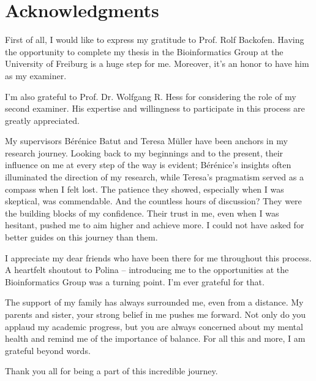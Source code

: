 \section*{Acknowledgments}

First of all, I would like to express my gratitude to Prof. Rolf Backofen. Having the opportunity to complete my thesis in the Bioinformatics Group at the University of Freiburg is a huge step for me.  Moreover, it's an honor to have him as my examiner.

I'm also grateful to Prof. Dr. Wolfgang R. Hess for considering the role of my second examiner. His expertise and willingness to participate in this process are greatly appreciated.

My supervisors Bérénice Batut and Teresa Müller have been anchors in my research journey. Looking back to my beginnings and to the present, their influence on me at every step of the way is evident; Bérénice's insights often illuminated the direction of my research, while Teresa's pragmatism served as a compass when I felt lost. The patience they showed, especially when I was skeptical, was commendable. And the countless hours of discussion? They were the building blocks of my confidence. Their trust in me, even when I was hesitant, pushed me to aim higher and achieve more. I could not have asked for better guides on this journey than them.

I appreciate my dear friends who have been there for me throughout this process. A heartfelt shoutout to Polina – introducing me to the opportunities at the Bioinformatics Group was a turning point. I'm ever grateful for that.

The support of my family has always surrounded me, even from a distance. My parents and sister, your strong belief in me pushes me forward. Not only do you applaud my academic progress, but you are always concerned about my mental health and remind me of the importance of balance. For all this and more, I am grateful beyond words.

Thank you all for being a part of this incredible journey.